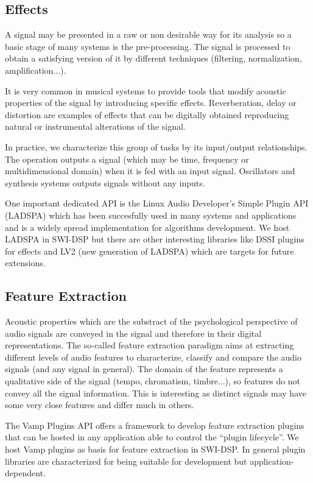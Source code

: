 \documentclass[runningheads]{llncs}
\begin{document}
\subsection{Effects}\label{subsec:effects}
A signal may be presented in a raw or non desirable way for its analysis so a basic stage of many systems is the pre-processing. The signal is processed to obtain a satisfying version of it by different techniques (filtering, normalization, amplification...).

It is very common in musical systems to provide tools that modify acoustic properties of the signal by introducing specific effects. Reverberation, delay or distortion are examples of effects that can be digitally obtained reproducing natural or instrumental alterations of the signal.

In practice, we characterize this group of tasks by its input/output relationships. The operation outputs a signal (which may be time, frequency or multidimensional domain) when it is fed with an input signal. %
Oscillators and synthesis systems outputs signals without any inputs.

One important dedicated API is the Linux Audio Developer's Simple Plugin API (LADSPA) \cite{ladspa}  which has been succesfully used in many systems and applications and is a widely spread implementation for algorithms development. We host LADSPA in SWI-DSP but there are other interesting libraries like DSSI plugins for effects and LV2 (new generation of LADSPA) which are targets for future extensions. 

\subsection{Feature Extraction}\label{subsec:feature}

Acoustic properties which are the substract of the psychological perspective of audio signals are conveyed in the signal and therefore in their digital representations. The so-called feature extraction paradigm aims at extracting different levels of audio features to characterize, classify and compare the audio signals (and any signal in general). The domain of the feature represents a qualitative side of the signal (tempo, chromatism, timbre...), so features do not convey all the signal information. This is interesting as distinct signals may have some very close features and differ much in others.

The Vamp Plugins API \cite{vamp} offers a framework to develop feature extraction plugins that can be hosted in any application able to control the ``plugin lifecycle''. We host Vamp plugins as basis for feature extraction in SWI-DSP. In general plugin libraries are characterized for being suitable for development but application-dependent.
\end{document}
